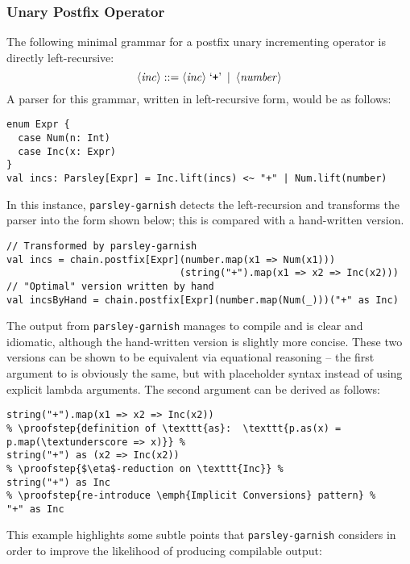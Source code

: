 \documentclass[../../main.tex]{subfiles}
\begin{document}
\subsubsection{Unary Postfix Operator}
The following minimal grammar for a postfix unary incrementing operator is directly left-recursive:
\begin{equation*}
\langle \mathit{inc} \rangle ::= \langle \mathit{inc} \rangle \; \text{`\texttt{+}'} \enspace | \enspace \langle \mathit{number} \rangle
\end{equation*}
%
A parser for this grammar, written in left-recursive form, would be as follows:
\begin{verbatim}
enum Expr {
  case Num(n: Int)
  case Inc(x: Expr)
}
val incs: Parsley[Expr] = Inc.lift(incs) <~ "+" | Num.lift(number)
\end{verbatim}
%
In this instance, \texttt{parsley-garnish} detects the left-recursion and transforms the parser into the form shown below; this is compared with a hand-written version.
\begin{verbatim}
// Transformed by parsley-garnish
val incs = chain.postfix[Expr](number.map(x1 => Num(x1)))
                              (string("+").map(x1 => x2 => Inc(x2)))
// "Optimal" version written by hand
val incsByHand = chain.postfix[Expr](number.map(Num(_)))("+" as Inc)
\end{verbatim}
%
The output from \texttt{parsley-garnish} manages to compile and is clear and idiomatic, although the hand-written version is slightly more concise.
These two versions can be shown to be equivalent via equational reasoning --
the first argument to  is obviously the same, but with placeholder syntax instead of using explicit lambda arguments.
The second argument can be derived as follows:
\begin{verbatim}
string("+").map(x1 => x2 => Inc(x2))
% \proofstep{definition of \texttt{as}:  \texttt{p.as(x) = p.map(\textunderscore => x)}} %
string("+") as (x2 => Inc(x2))
% \proofstep{$\eta$-reduction on \texttt{Inc}} %
string("+") as Inc
% \proofstep{re-introduce \emph{Implicit Conversions} pattern} %
"+" as Inc
\end{verbatim}
%
This example highlights some subtle points that \texttt{parsley-garnish} considers in order to improve the likelihood of producing compilable output:
\end{document}
